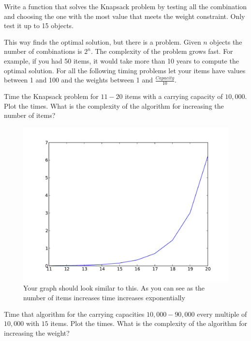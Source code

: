\begin{problem}
Write a function that solves the Knapsack problem by testing all the combination and choosing the one with the most value that meets the weight constraint.
Only test it up to 15 objects.
\end{problem}

This way finds the optimal solution, but there is a problem.
Given $n$ objects the number of combinations is $2^n$.
The complexity of the problem grows fast.
For example, if you had 50 items, it would take more than 10 years to compute the optimal solution.
For all the following timing problems let your items have values between 1 and 100 and the weights between 1 and $\frac{Capacity}{10}$.

\begin{problem}
Time the Knapsack problem for $11-20$ items with a carrying capacity of $10,000$.
Plot the times.
What is the complexity of the algorithm for increasing the number of items?
\end{problem}

\begin{figure}[H]
\includegraphics[scale = .5]{naiveTime.pdf}
\caption{
Your graph should look similar to this.
As you can see as the number of items increases time increases exponentially}
\end{figure}

\begin{problem}
Time that algorithm for the carrying capacities $10,000-90,000$ every multiple of $10,000$ with $15$ items.
Plot the times.
What is the complexity of the algorithm for increasing the weight?
\end{problem}

